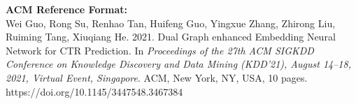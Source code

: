 \documentclass[sigconf]{acmart}
\begin{document}

\maketitle
{\fontsize{8pt}{8pt}\selectfont
\textbf{ACM Reference Format:}\\
Wei Guo, Rong Su, Renhao Tan, Huifeng Guo, Yingxue Zhang, Zhirong Liu, Ruiming Tang, Xiuqiang He. 2021. Dual Graph enhanced Embedding Neural Network for CTR Prediction. In \textit{Proceedings of the 27th ACM SIGKDD Conference on Knowledge Discovery and Data Mining (KDD’21), August 14–18, 2021, Virtual Event, Singapore}. ACM, New York, NY, USA, 10 pages. https://doi.org/10.1145/3447548.3467384}

\balance




\end{document}
